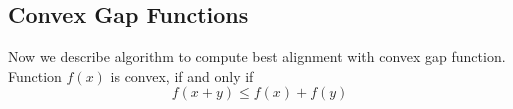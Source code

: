 \subsection{Convex Gap Functions}

Now we describe algorithm to compute best alignment with convex gap function.
Function $f(x)$ is convex, if and only if
\[f(x+y)\leq f(x)+f(y)\]
 



